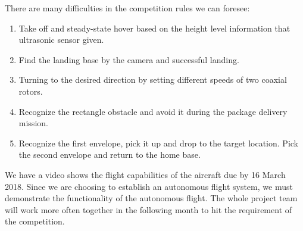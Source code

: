 \documentclass[onecolumn, draftclsnofoot,10pt, compsoc]{IEEEtran}
\begin{document}
There are many difficulties in the competition rules we can foresee: 
\begin{enumerate}
\item{Take off and steady-state hover based on the height level information that ultrasonic sensor given.}
\item{Find the landing base by the camera and successful landing.}
\item{Turning to the desired direction by setting different speeds of two coaxial rotors.}
\item{Recognize the rectangle obstacle and avoid it during the package delivery mission.}
\item{Recognize the first envelope, pick it up and drop to the target location. Pick the second envelope and return to the home base.}
\end{enumerate}

We have a video shows the flight capabilities of the aircraft due by 16 March 2018. Since we are choosing to establish an autonomous flight system, we must demonstrate the functionality of the autonomous flight. The whole project team will work more often together in the following month to hit the requirement of the competition.
\end{document}
